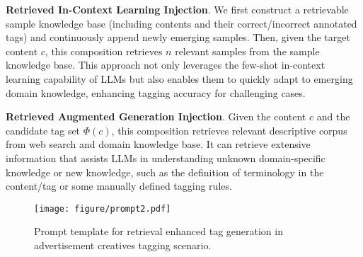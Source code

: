 

\textbf{Retrieved In-Context Learning Injection}.
We first construct a retrievable sample knowledge base (including contents and their correct/incorrect annotated tags) and continuously append newly emerging samples. 
Then, given the target content $c$, this composition retrieves $n$ relevant samples from the sample knowledge base. 
This approach not only leverages the few-shot in-context learning capability of LLMs but also enables them to quickly adapt to emerging domain knowledge, enhancing tagging accuracy for challenging cases.


\textbf{Retrieved Augmented Generation Injection}. 
Given the content $c$ and the candidate tag set $\Phi(c)$, this composition retrieves relevant descriptive corpus from web search and domain knowledge base. It can retrieve extensive information that assists LLMs in understanding unknown domain-specific knowledge or new knowledge, such as the definition of terminology in the content/tag or some manually defined tagging rules.

\begin{figure}[h]
    \centering
    \texttt{[image: figure/prompt2.pdf]}
    \caption{Prompt template for retrieval enhanced tag generation in advertisement creatives tagging scenario.}
    \label{fig:prompt2}
\end{figure}

